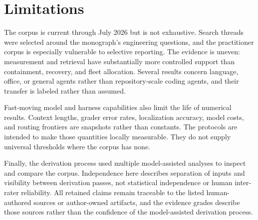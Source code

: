 \section{Limitations}

The corpus is current through July 2026 but is not exhaustive. Search threads were selected around the monograph's engineering questions, and the practitioner corpus is especially vulnerable to selective reporting. The evidence is uneven: measurement and retrieval have substantially more controlled support than containment, recovery, and fleet allocation. Several results concern language, office, or general agents rather than repository-scale coding agents, and their transfer is labeled rather than assumed.

Fast-moving model and harness capabilities also limit the life of numerical results. Context lengths, grader error rates, localization accuracy, model costs, and routing frontiers are snapshots rather than constants. The protocols are intended to make those quantities locally measurable. They do not supply universal thresholds where the corpus has none.

Finally, the derivation process used multiple model-assisted analyses to inspect and compare the corpus. Independence here describes separation of inputs and visibility between derivation passes, not statistical independence or human inter-rater reliability. All retained claims remain traceable to the listed human-authored sources or author-owned artifacts, and the evidence grades describe those sources rather than the confidence of the model-assisted derivation process.
